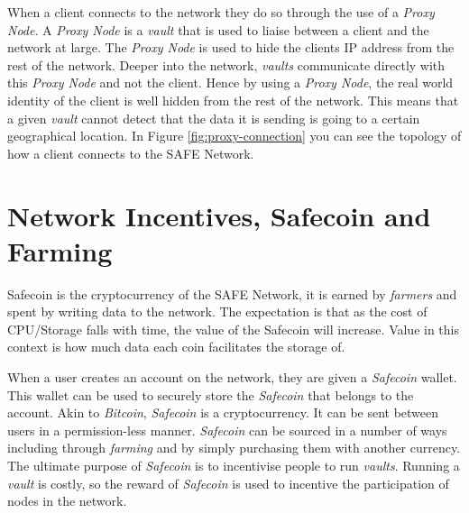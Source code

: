 When a client connects to the network they do so through the use of a \textit{Proxy Node}. A \textit{Proxy Node} is a \textit{vault} that is used to liaise between a client and the network at large. The \textit{Proxy Node} is used to hide the clients IP address from the rest of the network. Deeper into the network, \textit{vaults} communicate directly with this \textit{Proxy Node} and not the client. Hence by using a \textit{Proxy Node}, the real world identity of the client is well hidden from the rest of the network. This means that a given \textit{vault} cannot detect that the data it is sending is going to a certain geographical location. In Figure \ref{fig:proxy-connection} you can see the topology of how a client connects to the SAFE Network.

\section{Network Incentives, Safecoin and Farming}

Safecoin\cite{lambert2015safecoin} is the cryptocurrency of the SAFE Network, it is earned by \textit{farmers} and spent by writing data to the network. The expectation is that as the cost of CPU/Storage falls with time, the value of the Safecoin will increase. Value in this context is how much data each coin facilitates the storage of.

When a user creates an account on the network, they are given a \textit{Safecoin} wallet. This wallet can be used to securely store the \textit{Safecoin} that belongs to the account. Akin to \textit{Bitcoin}, \textit{Safecoin} is a cryptocurrency. It can be sent between users in a permission-less manner. \textit{Safecoin} can be sourced in a number of ways including through \textit{farming} and by simply purchasing them with another currency. The ultimate purpose of \textit{Safecoin} is to incentivise people to run \textit{vaults}. Running a \textit{vault} is costly, so the reward of \textit{Safecoin} is used to incentive the participation of nodes in the network.

